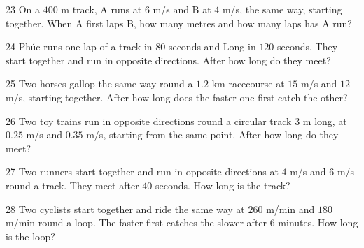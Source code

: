 \gap
\begin{probbox}{23}{\relax}
On a $400$ m track, A runs at $6$ m/s and B at $4$ m/s, the same way, starting together. When A first laps B, how many metres and how many laps has A run?
\end{probbox}
\gap
\begin{probbox}{24}{\relax}
Phúc runs one lap of a track in $80$ seconds and Long in $120$ seconds. They start together and run in opposite directions. After how long do they meet?
\end{probbox}
\gap
\begin{probbox}{25}{\relax}
Two horses gallop the same way round a $1.2$ km racecourse at $15$ m/s and $12$ m/s, starting together. After how long does the faster one first catch the other?
\end{probbox}
\gap
\begin{probbox}{26}{\relax}
Two toy trains run in opposite directions round a circular track $3$ m long, at $0.25$ m/s and $0.35$ m/s, starting from the same point. After how long do they meet?
\end{probbox}
\gap
\begin{probbox}{27}{\relax}
Two runners start together and run in opposite directions at $4$ m/s and $6$ m/s round a track. They meet after $40$ seconds. How long is the track?
\end{probbox}
\gap
\begin{probbox}{28}{\relax}
Two cyclists start together and ride the same way at $260$ m/min and $180$ m/min round a loop. The faster first catches the slower after $6$ minutes. How long is the loop?
\end{probbox}
